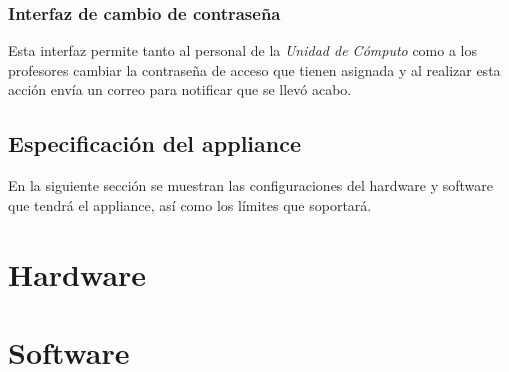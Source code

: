         \subsubsection {Interfaz de cambio de contrase\~{n}a}

Esta interfaz permite tanto al personal de la \textit{Unidad de C\'{o}mputo} como a los profesores cambiar la contrase\~{n}a de acceso que tienen asignada y al realizar esta acci\'{o}n env\'{i}a un correo para notificar que se llev\'{o} acabo.

    \subsection {Especificaci\'{o}n del appliance}

En la siguiente secci\'{o}n se muestran las configuraciones del hardware y software que tendr\'{a} el appliance, as\'{i} como los l\'{i}mites que soportar\'{a}.

      \section {Hardware}


\begin{table}[H]
\caption{Recursos de hardware utilizados para el appliance}{}
\label{tab:recursos-hardware}
\noindent{} %
\end{table}

      \section {Software}

